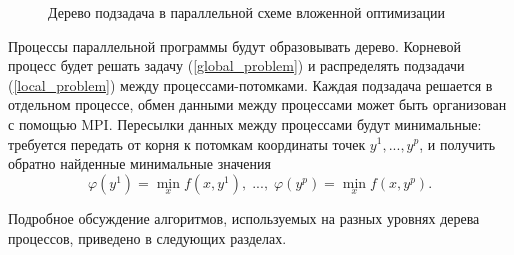 \documentclass{svproc}
\begin{document}
\begin{figure}
\caption{Дерево подзадача в параллельной схеме вложенной оптимизации}
\label{MPI_tree}
\end{figure}

Процессы параллельной программы будут образовывать дерево. 
Корневой процесс будет решать задачу (\ref{global_problem}) и распределять подзадачи (\ref{local_problem}) между процессами-потомками. Каждая подзадача решается в отдельном процессе, обмен данными между процессами может быть организован с помощью MPI. Пересылки данных между процессами будут минимальные: требуется передать от корня к потомкам координаты точек $y^1, ..., y^p$, и получить обратно найденные минимальные значения 
\[
\varphi(y^1) = \min_x f(x,y^1),\; ..., \; \varphi(y^p) = \min_x f(x,y^p).
\]

Подробное обсуждение алгоритмов, используемых на разных уровнях дерева процессов, приведено в следующих разделах.  
\end{document}
